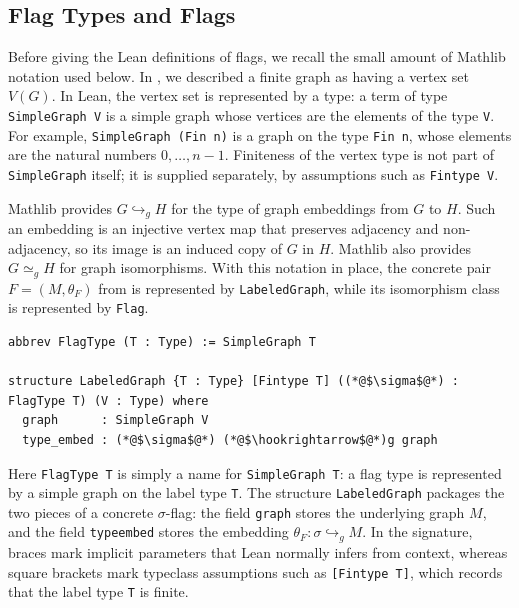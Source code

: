 \documentclass[acmsmall,screen=true,acmthm=false]{acmart}
\DeclareRobustCommand{\lean}[1]{{\def\_{\textunderscore\allowbreak}\texttt{#1}}}
\begin{document}
\subsection{Flag Types and Flags}
\label{sec:flagtypes}

Before giving the Lean definitions of flags, we recall the small amount of
Mathlib notation used below.  In , we described a finite
graph as having a vertex set $V(G)$.  In Lean, the vertex set is represented
by a type: a term of type \lean{SimpleGraph V} is a simple graph whose
vertices are the elements of the type \lean{V}.  For example,
\lean{SimpleGraph (Fin n)} is a graph on the type \lean{Fin n}, whose elements
are the natural numbers \(0,\ldots,n-1\).  Finiteness of the vertex type is
not part of \lean{SimpleGraph} itself; it is supplied separately, by
assumptions such as \lean{Fintype V}.

Mathlib provides ${G\hookrightarrow_g H}$ for the type of graph embeddings
from $G$ to $H$.  Such an embedding is an injective vertex map that preserves
adjacency and non-adjacency, so its image is an induced copy of $G$ in $H$.  Mathlib also provides $G\simeq_g H$ for graph isomorphisms.
With this notation in place, the concrete pair $F=(M,\theta_F)$ from
 is represented by \lean{LabeledGraph}, while its
isomorphism class is represented by \lean{Flag}.

\begin{lstlisting}
abbrev FlagType (T : Type) := SimpleGraph T

structure LabeledGraph {T : Type} [Fintype T] ((*@$\sigma$@*) : FlagType T) (V : Type) where
  graph      : SimpleGraph V
  type_embed : (*@$\sigma$@*) (*@$\hookrightarrow$@*)g graph
\end{lstlisting}
Here \lean{FlagType T} is simply a name for \lean{SimpleGraph T}: a flag type
is represented by a simple graph on the label type \lean{T}.  The structure
\lean{LabeledGraph} packages the two pieces of a concrete $\sigma$-flag: the
field \lean{graph} stores the underlying graph $M$, and the field
\lean{type\_embed} stores the embedding
$\theta_F:\sigma\hookrightarrow_g M$.  In the signature, braces mark implicit
parameters that Lean normally infers from context, whereas square brackets
mark typeclass assumptions such as \lean{[Fintype T]}, which records that the
label type \lean{T} is finite.
\end{document}
